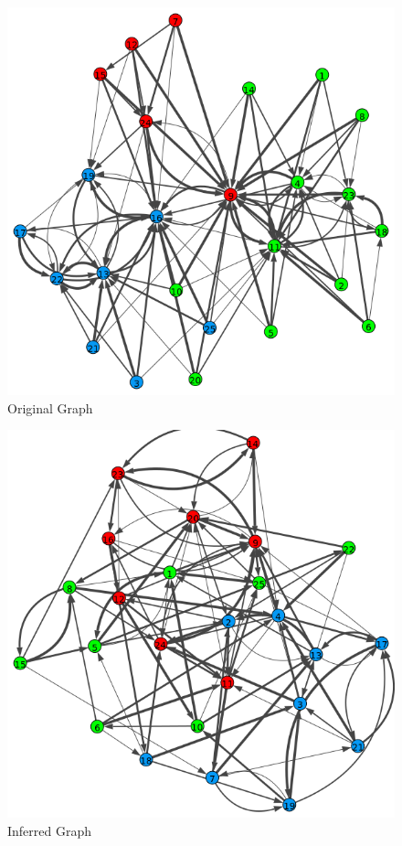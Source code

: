 \documentclass[12pt]{ociamthesis}  %
\begin{document}
	\begin{figure}
		\centering
		\includegraphics[width=\textwidth,height=\textheight,keepaspectratio]{OriginalPlotFixedPrior}
		\caption{Original Graph}
		\label{label-image10}
	\end{figure}
	
	\begin{figure}
		\centering
		\includegraphics[width=\textwidth,height=\textheight,keepaspectratio]{OptimizationPlotFixedPrior}
		\caption{Inferred Graph}
		\label{label-image11}
	\end{figure}
	
\end{document}
